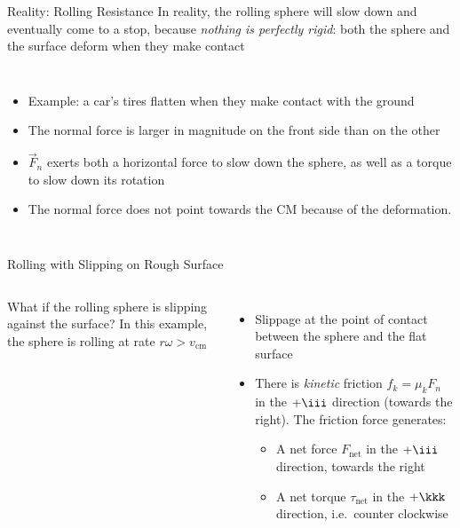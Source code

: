 \documentclass[12pt,compress,aspectratio=169]{beamer}
\begin{document}
\begin{frame}{Reality: Rolling Resistance}
  In reality, the rolling sphere will slow down and eventually come to a stop,
  because \emph{nothing is perfectly rigid}: both the sphere and the surface
  deform when they make contact
  \begin{columns}
    \begin{itemize}
    \item Example: a car's tires flatten when they make contact with the ground
    \item The normal force is larger in magnitude on the front side than on the
      other
    \item $\vec F_n$ exerts both a horizontal force to slow down the sphere, as well
      as a torque to slow down its rotation
    \item The normal force does not point towards the CM because of the
      deformation.
    \end{itemize}

    \vspace{.3in}
  \end{columns}
\end{frame}




\begin{frame}{Rolling with Slipping on Rough Surface}
  \begin{columns}
    

    What if the rolling sphere is slipping against the surface? In this
    example, the sphere is rolling at rate $r\omega>v_\text{cm}$
    \begin{itemize}
    \item Slippage at the point of contact between the sphere and the flat
      surface
    \item There is \emph{kinetic} friction $f_k=\mu_kF_n$ in the $+\iii$
      direction (towards the right). The friction force generates:
      \begin{itemize}
      \item A net force $F_\text{net}$ in the $+\iii$ direction, towards the
        right
      \item A net torque $\tau_\text{net}$ in the $+\kkk$ direction, i.e.\
        counter clockwise
      \end{itemize}
    \end{itemize}
  \end{columns}
\end{frame}
\end{document}
